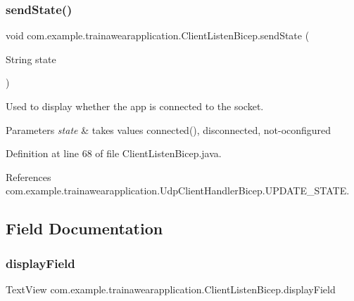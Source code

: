\subsubsection{\texorpdfstring{sendState()}{sendState()}}
{\footnotesize\ttfamily void com.\+example.\+trainawearapplication.\+Client\+Listen\+Bicep.\+send\+State (\begin{DoxyParamCaption}\item[{String}]{state }\end{DoxyParamCaption})\hspace{0.3cm}{\ttfamily [private]}}



Used to display whether the app is connected to the socket. 


\begin{DoxyParams}{Parameters}
{\em state} & takes values connected(), disconnected, not-\/oconfigured \\
\hline
\end{DoxyParams}


Definition at line 68 of file Client\+Listen\+Bicep.\+java.


\begin{DoxyCode}{0}

\end{DoxyCode}


References com.\+example.\+trainawearapplication.\+Udp\+Client\+Handler\+Bicep.\+U\+P\+D\+A\+T\+E\+\_\+\+S\+T\+A\+TE.



\subsection{Field Documentation}
\mbox{\label{classcom_1_1example_1_1trainawearapplication_1_1_client_listen_bicep_a9634b0b5b3f74403071bf066606a0555}} 
\subsubsection{\texorpdfstring{displayField}{displayField}}
{\footnotesize\ttfamily Text\+View com.\+example.\+trainawearapplication.\+Client\+Listen\+Bicep.\+display\+Field\hspace{0.3cm}{\ttfamily [private]}}



